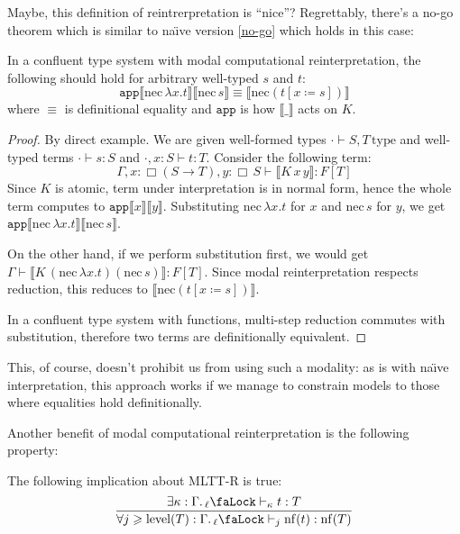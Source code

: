 Maybe, this definition of reintrerpretation is ``nice''?
Regrettably, there's a no-go theorem which is similar to
na\"{\i}ve version \ref{no-go} which holds in this case:

\begin{theorem}
    In a confluent type system with modal computational
    reinterpretation, the following should hold for
    arbitrary well-typed $s$ and $t$:
    \[
        \mathtt{app}\llbracket\mathrm{nec}\,\lambda x.t
        \rrbracket\llbracket\mathrm{nec}\,s\rrbracket
        \equiv\llbracket\mathrm{nec}(t[x\coloneqq s])
        \rrbracket
    \]
    where $\equiv$ is definitional equality and
    $\mathtt{app}$ is how $\llbracket\_\rrbracket$
    acts on $K$.
\end{theorem}

\begin{proof}
    By direct example. We are given well-formed types
    $\cdot\vdash S,T\,\mathrm{type}$ and well-typed
    terms $\cdot\vdash s:S$ and $\cdot,x:S\vdash t:T$.
    Consider the following term:
    \[
        \Gamma,x:\Box(S\to T),y:\Box\,S\vdash
            \llbracket K\,x\,y\rrbracket:F[T]
    \]
    Since $K$ is atomic, term under interpretation is in
    normal form, hence the whole term computes to
    $\mathtt{app}\llbracket x\rrbracket \llbracket y
    \rrbracket$. Substituting $\mathrm{nec}\,
    \lambda x.t$ for $x$ and $\mathrm{nec}\,s$ for $y$,
    we get $\mathtt{app}\llbracket\mathrm{nec}\,
    \lambda x.t\rrbracket\llbracket\mathrm{nec}\,
    s\rrbracket$.

    On the other hand, if we perform substitution first,
    we would get $\Gamma\vdash\llbracket K\,
    (\mathrm{nec}\,\lambda x.t)(\mathrm{nec}\,s)
    \rrbracket:F[T]$. Since modal reinterpretation
    respects reduction, this reduces to
    $\llbracket\mathrm{nec}(t[x\coloneqq s])\rrbracket$.

    In a confluent type system with functions,
    multi-step reduction commutes with substitution,
    therefore two terms are definitionally equivalent.
\end{proof}

This, of course, doesn't prohibit us from using such a
modality: as is with na\"{\i}ve interpretation, this
approach works if we manage to constrain models to those
where equalities hold definitionally.

Another benefit of modal computational reinterpretation
is the following property:

\begin{theorem}
    The following implication about MLTT-R is true:
    \[\dfrac{
        \exists\kappa:
        \Gamma.\,{}_\ell\text{\faLock}\vdash_\kappa
        t:T
    }{\forall j\geqslant\mathrm{level}(T):
        \Gamma.\,{}_\ell\text{\faLock}\vdash_j
    \mathrm{nf}(t):\mathrm{nf}(T)}\]
\end{theorem}

